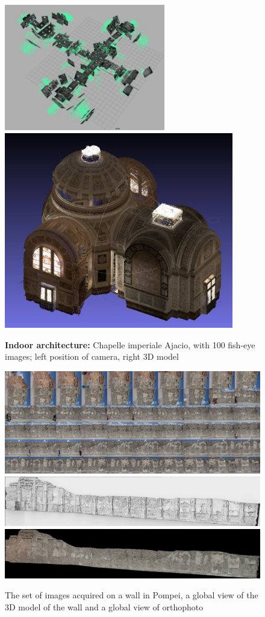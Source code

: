 \begin{figure}
\includegraphics[width=70mm]{FIGS/SAMPLES/Aj2.jpg}
\includegraphics[width=100mm]{FIGS/SAMPLES/Aj1.jpg}
\caption{{\bf Indoor architecture: } Chapelle imperiale Ajacio, with 100 fish-eye images;
left position of camera, right 3D model}
\end{figure}



\begin{figure}
\includegraphics[width=160mm]{FIGS/SAMPLES/Pompei-Planche.jpg}
\includegraphics[width=160mm]{FIGS/SAMPLES/Pompei-Shade2.jpg}
\includegraphics[width=160mm]{FIGS/SAMPLES/Pompei-Ortho1.jpg}
\caption{The set of images acquired on a wall in Pompei, a global
view of the 3D model of the wall and a global view of orthophoto}
\end{figure}


